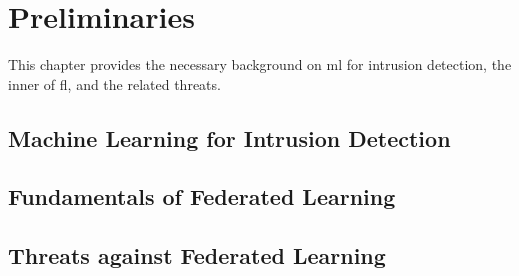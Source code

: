 \chapter{Preliminaries\label{chap:background}}
\localtoc


This chapter provides the necessary background on \acrfull{ml} for intrusion detection, the inner of \acrfull{fl}, and the related threats.

\section{Machine Learning for Intrusion Detection\label{sec:ml}}

\section{Fundamentals of Federated Learning\label{sec:fl}}

\section{Threats against Federated Learning\label{sec:threats}}